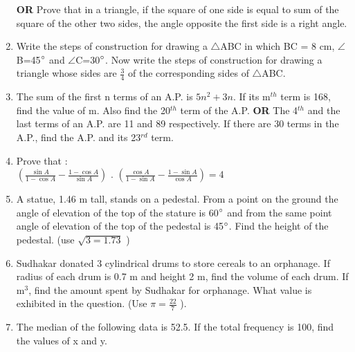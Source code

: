 \documentclass[journal,12pt,twocolumn]{IEEEtran}
\renewcommand\thesection{\arabic{section}}
\begin{document}
\begin{enumerate}[label=\thesection.\arabic*.,ref=\thesection.\theenumi]
\newline \textbf{OR} 
Prove that in a triangle, if the square of one side is equal to sum of the square of the other two sides, the angle opposite the first side is a right angle.\\
\item Write the steps of construction for drawing a $\triangle$ABC in which BC = 8 cm, $\angle$B=45$\degree$ and $\angle$C=30$\degree$. Now write the steps of construction for drawing a triangle whose sides are $\frac{3}{4}$ of the corresponding sides of $\triangle$ABC.\\
\item The sum of the first n terms of an A.P. is $5n^2 + 3n$. If its m$^{th}$ term is 168, find the value of m. Also find the 20$^{th}$ term of the A.P.
\newline \textbf{OR} \newline
The 4$^{th}$ and the last terms of an A.P. are 11 and 89 respectively. If there are 30 terms in the A.P., find the A.P. and its 23$^{rd}$ term.\\
\item Prove that : \\ $(\frac{\sin A}{1-\cos A}-\frac{1-\cos A}{\sin A})$ . $(\frac{\cos A}{1-\sin A}-\frac{1-\sin A}{\cos A}) = 4$ \\
\item A statue, 1.46 m tall, stands on a pedestal. From a point on the ground the angle of elevation of the top of the stature is 60$\degree$ and from the same point angle of elevation of the top of the pedestal is 45$\degree$. Find the height of the pedestal. (use $\sqrt{3=1.73}$ ) \\
\item Sudhakar donated 3 cylindrical drums to store cereals to an orphanage. If radius of each drum is 0.7 m and height 2 m, find the volume of each drum. If m$^3$, find the amount spent by Sudhakar for orphanage. What value is exhibited in the question. (Use $\pi = \frac{22}{7}$ ).\\

\item The median of the following data is 52.5. If the total frequency is 100, find the values of x and y.\\
\begin{table}[htb]
	\centering
\end{table}
\end{enumerate}
\end{document}
